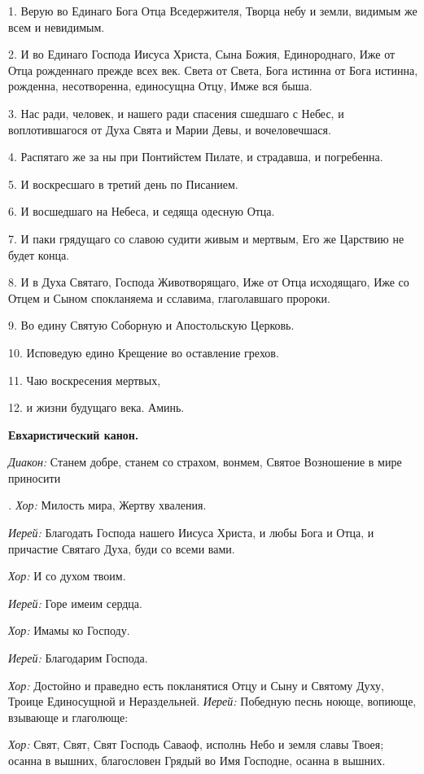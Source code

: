    1. Верую во Единаго Бога Отца Вседержителя, Творца небу и земли, видимым же всем и невидимым. 

   2. И во Единаго Господа Иисуса Христа, Сына Божия, Единороднаго, Иже от Отца рожденнаго прежде всех век. Света от Света, Бога истинна от Бога истинна, рожденна, несотворенна, единосущна Отцу, Имже вся быша.

   3. Нас ради, человек, и нашего ради спасения сшедшаго с Небес, и воплотившагося от Духа Свята и Марии Девы, и вочеловечшася.

   4. Распятаго же за ны при Понтийстем Пилате, и страдавша, и погребенна.

   5. И воскресшаго в третий день по Писанием.

   6. И восшедшаго на Небеса, и седяща одесную Отца.

   7. И паки грядущаго со славою судити живым и мертвым, Его же Царствию не будет конца.

   8. И в Духа Святаго, Господа Животворящаго, Иже от Отца исходящаго, Иже со Отцем и Сыном спокланяема и сславима, глаголавшаго пророки.

   9. Во едину Святую Соборную и Апостольскую Церковь.

   10. Исповедую едино Крещение во оставление грехов.

   11. Чаю воскресения мертвых,

   12. и жизни будущаго века. Аминь.  

\medskip 

{\bfseries  Евхаристический канон. }

 {\itshape  Диакон:} Станем добре, станем со страхом, вонмем, Святое Возношение в мире приносити

{\itshape .    Хор:} Милость мира, Жертву хваления. 

{\itshape    Иерей:} Благодать Господа нашего Иисуса Христа, и любы Бога и Отца, и причастие Святаго Духа, буди со всеми вами.

 {\itshape Хор:} И со духом твоим. 

{\itshape    Иерей:} Горе имеим сердца. 

{\itshape    Хор:} Имамы ко Господу. 

{\itshape    Иерей:} Благодарим Господа. 

{\itshape    Хор:} Достойно и праведно есть покланятися Отцу и Сыну и Святому Духу, Троице Единосущной и Нераздельней. {\itshape  Иерей:} Победную песнь ноюще, вопиюще, взывающе и глаголюще: 

{\itshape    Хор:} Свят, Свят, Свят Господь Саваоф, исполнь Небо и земля славы Твоея; осанна в вышних, благословен Грядый во Имя Господне, осанна в вышних. 


